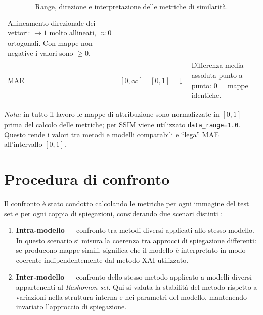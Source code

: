 \documentclass[12pt,a4paper,oneside]{report}
\numberwithin{figure}{chapter}
\numberwithin{table}{chapter}
\begin{document}
\begin{table}[H]
\begin{minipage}{0.98\linewidth}
\begin{tabularx}{\linewidth}{l c c c Y}
                  Allineamento direzionale dei vettori: $\to 1$ molto allineati, $\approx 0$ ortogonali. Con mappe non negative i valori sono $\ge 0$.                                                     \\
                  MAE               & $[0,\infty]$           & $[0,1]$            & $\downarrow$    &
                  Differenza media assoluta punto-a-punto: $0$ = mappe identiche.                                                                                                                          \\
                  \hline
            \end{tabularx}
            \caption{Range, direzione e interpretazione delle metriche di similarità.}
            \label{tab:metrics_range_interpretation}
      \end{minipage}
\end{table}

\noindent
\textit{Nota:} in tutto il lavoro le mappe di attribuzione sono normalizzate in $[0,1]$ prima del calcolo delle metriche; per SSIM viene utilizzato \texttt{data\_range=1.0}. Questo rende i valori tra metodi e modelli comparabili e “lega” MAE all’intervallo $[0,1]$.

\section{Procedura di confronto}
Il confronto è stato condotto calcolando le metriche per ogni immagine del test
set e per ogni coppia di spiegazioni, considerando due scenari distinti
\citep{bhatt2021evaluating, mueller2023rashomon, leventi2023consistency,
      krishna2022disagreement}:

\begin{enumerate}
      \item \textbf{Intra-modello} — confronto tra metodi diversi applicati allo stesso modello.
            In questo scenario si misura la coerenza tra approcci di spiegazione differenti:
            se producono mappe simili, significa che il modello è interpretato in modo coerente
            indipendentemente dal metodo XAI utilizzato.

      \item \textbf{Inter-modello} — confronto dello stesso metodo applicato a modelli diversi
            appartenenti al \emph{Rashomon set}.
            Qui si valuta la stabilità del metodo rispetto a variazioni nella struttura interna
            e nei parametri del modello, mantenendo invariato l’approccio di spiegazione.
\end{enumerate}
\end{document}
